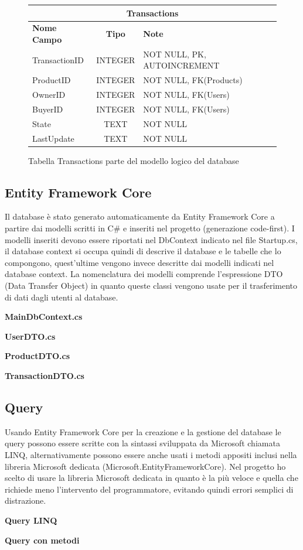 \begin{figure}[ht]
    \centering\begin{tabular}{ |l|c|l| } 
    \hline
    \multicolumn{3}{|c|}{\large\textbf{Transactions}} \\
    \hline
    \textbf{Nome Campo} & \textbf{Tipo} & \textbf{Note} \\
    \hline
    TransactionID & INTEGER & NOT NULL, PK, AUTOINCREMENT \\
    ProductID & INTEGER & NOT NULL, FK(Products) \\
    OwnerID & INTEGER & NOT NULL, FK(Users) \\
    BuyerID & INTEGER & NOT NULL, FK(Users) \\
    State & TEXT & NOT NULL \\
    LastUpdate & TEXT & NOT NULL \\
    \hline
    \end{tabular}
    \caption{Tabella Transactions parte del modello logico del database}
\end{figure}
\clearpage
\subsection{Entity Framework Core}
Il database è stato generato automaticamente da Entity Framework Core a partire dai modelli scritti in C\# e inseriti nel progetto (generazione code-first). I modelli inseriti devono essere riportati nel DbContext indicato nel file Startup.cs, il database context si occupa quindi di descrive il database e le tabelle che lo compongono, quest'ultime vengono invece descritte dai modelli indicati nel database context. La nomenclatura dei modelli comprende l'espressione DTO (Data Transfer Object) in quanto queste classi vengono usate per il trasferimento di dati dagli utenti al database. 
\bigskip

\textbf{MainDbContext.cs}

\bigskip

\textbf{UserDTO.cs}

\bigskip

\textbf{ProductDTO.cs}

\bigskip

\textbf{TransactionDTO.cs}


\subsection{Query}
Usando Entity Framework Core per la creazione e la gestione del database le query possono essere scritte con la sintassi sviluppata da Microsoft chiamata LINQ, alternativamente possono essere anche usati i metodi appositi inclusi nella libreria Microsoft dedicata (Microsoft.EntityFrameworkCore). Nel progetto ho scelto di usare la libreria Microsoft dedicata in quanto è la più veloce e quella che richiede meno l'intervento del programmatore, evitando quindi errori semplici di distrazione. 
\bigskip

\textbf{Query LINQ}

\bigskip

\textbf{Query con metodi}
